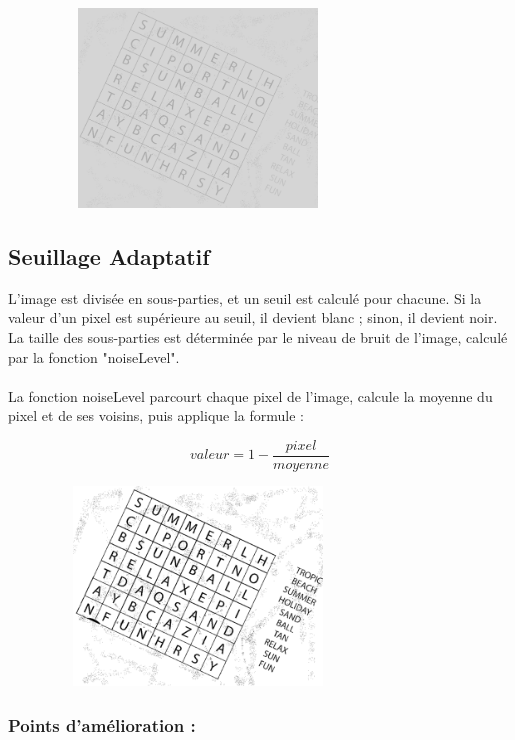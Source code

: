 \begin{figure}[hbt]
	\centering
	\includegraphics[width=300px,height=200px]{obrazky-figures/4.png}
\end{figure}

\subsection{Seuillage Adaptatif}

L'image est divisée en sous-parties, et un seuil est calculé pour chacune. Si la valeur d'un pixel est supérieure au seuil, il devient blanc ; sinon, il devient noir. La taille des sous-parties est déterminée par le niveau de bruit de l'image, calculé par la fonction "noiseLevel". \\\\
La fonction noiseLevel parcourt chaque pixel de l'image, calcule la moyenne du pixel et de ses voisins, puis applique la formule :

\[
valeur = 1 - \frac{pixel}{moyenne}
\]

\begin{figure}[hbt]
	\centering
	\includegraphics[width=300px,height=200px]{obrazky-figures/5.png}
\end{figure}


\subsubsection{Points d'amélioration :}

